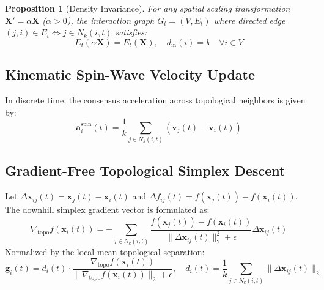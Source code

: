 \documentclass[journal]{IEEEtran}
\newtheorem{proposition}{Proposition}
\begin{document}
\begin{proposition}[Density Invariance]
For any spatial scaling transformation $\mathbf{X}' = \alpha \mathbf{X}$ ($\alpha > 0$), the interaction graph $G_t = (V, E_t)$ where directed edge $(j, i) \in E_t \iff j \in N_k(i, t)$ satisfies:
\begin{equation}
E_t(\alpha \mathbf{X}) = E_t(\mathbf{X}), \quad d_{\text{in}}(i) = k \quad \forall i \in V
\end{equation}
\end{proposition}

\subsection{Kinematic Spin-Wave Velocity Update}
In discrete time, the consensus acceleration across topological neighbors is given by:
\begin{equation}
\mathbf{a}_i^{\text{spin}}(t) = \frac{1}{k} \sum_{j \in N_k(i, t)} (\mathbf{v}_j(t) - \mathbf{v}_i(t))
\end{equation}

\subsection{Gradient-Free Topological Simplex Descent}
Let $\Delta \mathbf{x}_{ij}(t) = \mathbf{x}_j(t) - \mathbf{x}_i(t)$ and $\Delta f_{ij}(t) = f(\mathbf{x}_j(t)) - f(\mathbf{x}_i(t))$. The downhill simplex gradient vector is formulated as:
\begin{equation}
\nabla_{\text{topo}} f(\mathbf{x}_i(t)) = -\sum_{j \in N_k(i, t)} \frac{f(\mathbf{x}_j(t)) - f(\mathbf{x}_i(t))}{\|\Delta \mathbf{x}_{ij}(t)\|_2^2 + \epsilon} \Delta \mathbf{x}_{ij}(t)
\end{equation}
Normalized by the local mean topological separation:
\begin{equation}
\mathbf{g}_i(t) = \bar{d}_i(t) \cdot \frac{\nabla_{\text{topo}} f(\mathbf{x}_i(t))}{\|\nabla_{\text{topo}} f(\mathbf{x}_i(t))\|_2 + \epsilon}, \quad \bar{d}_i(t) = \frac{1}{k} \sum_{j \in N_k(i, t)} \|\Delta \mathbf{x}_{ij}(t)\|_2
\end{equation}
\end{document}
